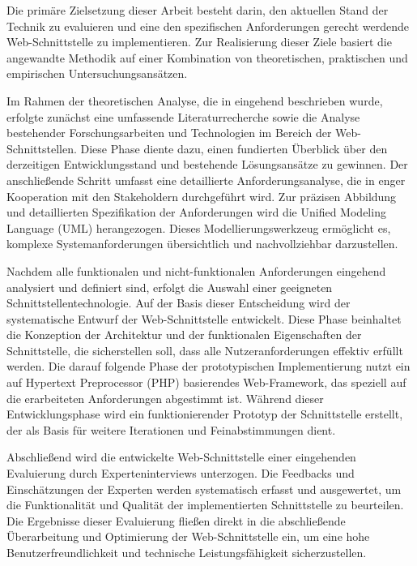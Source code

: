 \documentclass[draft,final]{vutinfth} %
\begin{document}
Die primäre Zielsetzung dieser Arbeit besteht darin, den aktuellen Stand der Technik zu evaluieren und eine den spezifischen Anforderungen gerecht werdende Web-Schnittstelle zu implementieren. 
Zur Realisierung dieser Ziele basiert die angewandte Methodik auf einer Kombination von theoretischen, praktischen und empirischen Untersuchungsansätzen.

Im Rahmen der theoretischen Analyse, die in  eingehend beschrieben wurde, erfolgte zunächst eine umfassende Literaturrecherche sowie die Analyse bestehender Forschungsarbeiten und Technologien im Bereich der Web-Schnittstellen. 
Diese Phase diente dazu, einen fundierten Überblick über den derzeitigen Entwicklungsstand und bestehende Lösungsansätze zu gewinnen.
Der anschließende Schritt umfasst eine detaillierte Anforderungsanalyse, die in enger Kooperation mit den Stakeholdern durchgeführt wird. 
Zur präzisen Abbildung und detaillierten Spezifikation der Anforderungen wird die Unified Modeling Language (UML) herangezogen. 
Dieses Modellierungswerkzeug ermöglicht es, komplexe Systemanforderungen übersichtlich und nachvollziehbar darzustellen.

Nachdem alle funktionalen und nicht-funktionalen Anforderungen eingehend analysiert und definiert sind, erfolgt die Auswahl einer geeigneten Schnittstellentechnologie. 
Auf der Basis dieser Entscheidung wird der systematische Entwurf der Web-Schnittstelle entwickelt. 
Diese Phase beinhaltet die Konzeption der Architektur und der funktionalen Eigenschaften der Schnittstelle, die sicherstellen soll, dass alle Nutzeranforderungen effektiv erfüllt werden.
Die darauf folgende Phase der prototypischen Implementierung nutzt ein auf Hypertext Preprocessor (PHP) basierendes Web-Framework, das speziell auf die erarbeiteten Anforderungen abgestimmt ist. 
Während dieser Entwicklungsphase wird ein funktionierender Prototyp der Schnittstelle erstellt, der als Basis für weitere Iterationen und Feinabstimmungen dient.

Abschließend wird die entwickelte Web-Schnittstelle einer eingehenden Evaluierung durch Experteninterviews unterzogen. 
Die Feedbacks und Einschätzungen der Experten werden systematisch erfasst und ausgewertet, um die Funktionalität und Qualität der implementierten Schnittstelle zu beurteilen. 
Die Ergebnisse dieser Evaluierung fließen direkt in die abschließende Überarbeitung und Optimierung der Web-Schnittstelle ein, um eine hohe Benutzerfreundlichkeit und technische Leistungsfähigkeit sicherzustellen.
\end{document}
